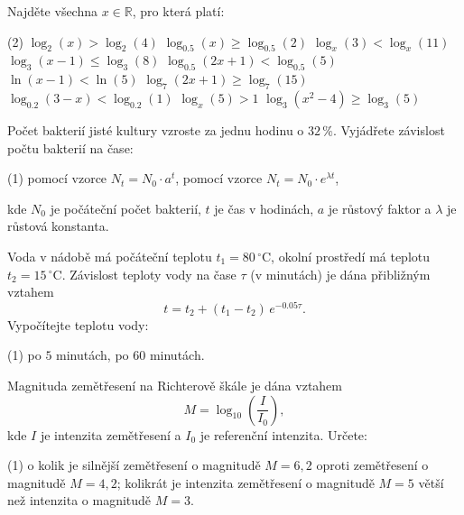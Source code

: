 \documentclass[12pt,a4paper]{article}
\begin{document}
\begin{exercise}
    Najděte všechna $x \in \mathbb{R}$, pro která platí:
    \begin{tasks}(2)
        \task $\log_2(x) > \log_2(4)$
        \task $\log_{0.5}(x) \ge \log_{0.5}(2)$
        \task $\log_x(3) < \log_x(11)$
        \task $\log_3(x - 1) \le \log_3(8)$
        \task $\log_{0.5}(2x + 1) < \log_{0.5}(5)$
        \task $\ln(x - 1) < \ln(5)$
        \task $\log_7(2x + 1) \ge \log_7(15)$
        \task $\log_{0.2}(3 - x) < \log_{0.2}(1)$
        \task $\log_x(5) > 1$
        \task $\log_3(x^2 - 4) \ge \log_3(5)$
    \end{tasks}
\end{exercise}

\setcounter{section}{2}
\begin{exercise}
    Počet bakterií jisté kultury vzroste za jednu hodinu o \(32\,\%\).  
    Vyjádřete závislost počtu bakterií na čase:
    \begin{tasks}(1)
        \task pomocí vzorce \(N_t = N_0 \cdot a^t\),
        \task pomocí vzorce \(N_t = N_0 \cdot e^{\lambda t}\),
    \end{tasks}
    kde \(N_0\) je počáteční počet bakterií, \(t\) je čas v hodinách,  
    \(a\) je růstový faktor a \(\lambda\) je růstová konstanta.
\end{exercise}


\begin{exercise}
    Voda v nádobě má počáteční teplotu \(t_1 = 80\,^\circ\mathrm{C}\), 
    okolní prostředí má teplotu \(t_2 = 15\,^\circ\mathrm{C}\).  
    Závislost teploty vody na čase \(\tau\) (v minutách) je dána přibližným vztahem
    \[
    t = t_2 + (t_1 - t_2)\, e^{-0.05\tau}.
    \]
    Vypočítejte teplotu vody:
    \begin{tasks}(1)
        \task po \(5\) minutách,
        \task po \(60\) minutách.
    \end{tasks}
\end{exercise}


\begin{exercise}
    Magnituda zemětřesení na Richterově škále je dána vztahem
    \[
    M = \log_{10}\!\left(\frac{I}{I_0}\right),
    \]
    kde \(I\) je intenzita zemětřesení a \(I_0\) je referenční intenzita.
    Určete:
    \begin{tasks}(1)
        \task o kolik je silnější zemětřesení o magnitudě \(M = 6{,}2\) oproti zemětřesení o magnitudě \(M = 4{,}2\);
        \task kolikrát je intenzita zemětřesení o magnitudě \(M = 5\) větší než intenzita o magnitudě \(M = 3\).
    \end{tasks}
\end{exercise}
\end{document}
